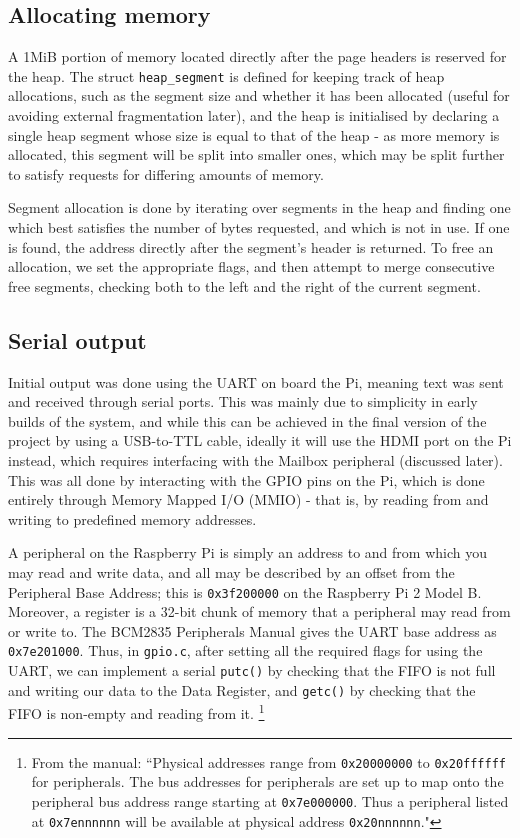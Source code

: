 \documentclass[10pt,a4paper]{article}
\newcommand{\code}[1]{\texttt{#1}}
\begin{document}
\subsection*{Allocating memory}
A 1MiB portion of memory located directly after the page headers is reserved for
the heap. The struct \code{heap\_segment} is defined for keeping track of heap
allocations, such as the segment size and whether it has been allocated (useful
for avoiding external fragmentation later), and the heap is initialised by
declaring a single heap segment whose size is equal to that of the heap - as
more memory is allocated, this segment will be split into smaller ones, which
may be split further to satisfy requests for differing amounts of memory.

Segment allocation is done by iterating over segments in the heap and finding
one which best satisfies the number of bytes requested, and which is not in use.
If one is found, the address directly after the segment's header is returned.
To free an allocation, we set the appropriate flags, and then attempt to merge
consecutive free segments, checking both to the left and the right of the
current segment.

\subsection*{Serial output}
Initial output was done using the UART on board the Pi, meaning text was sent
and received through serial ports. This was mainly due to simplicity in early
builds of the system, and while this can be achieved in the final version of the
project by using a USB-to-TTL cable, ideally it will use the HDMI port on the Pi
instead, which requires interfacing with the Mailbox peripheral (discussed
later). This was all done by interacting with the GPIO pins on the Pi, which is
done entirely through Memory Mapped I/O (MMIO) - that is, by reading from and
writing to predefined memory addresses. 

A peripheral on the Raspberry Pi is simply an address to and from which you may
read and write data, and all may be described by an offset from the Peripheral
Base Address; this is \code{0x3f200000} on the Raspberry Pi 2 Model B. Moreover,
a register is a 32-bit chunk of memory that a peripheral may read from or write
to. The BCM2835 Peripherals Manual gives the UART base address as
\code{0x7e201000}. Thus, in \code{gpio.c}, after setting all the required flags
for using the UART, we can implement a serial \code{putc()} by checking that the
FIFO is not full and writing our data to the Data Register, and \code{getc()} by
checking that the FIFO is non-empty and reading from it. \footnote{From the
manual: ``Physical addresses range from \code{0x20000000} to \code{0x20ffffff}
for peripherals. The bus addresses for peripherals are set up to map onto the
peripheral bus address range starting at \code{0x7e000000}. Thus a peripheral
listed at \code{0x7ennnnnn} will be available at physical address
\code{0x20nnnnnn}."}
\end{document}
